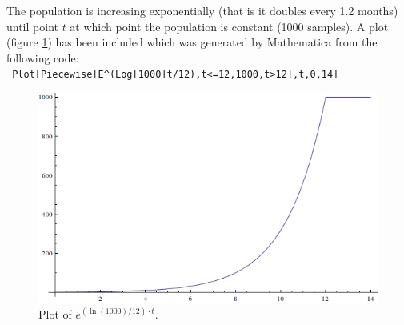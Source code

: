 \begin{enumerate}
  The population is increasing exponentially (that is it doubles every 1.2
  months) until point $t$ at which point the population is constant (1000
  samples). A plot (figure \ref{fig:q5plot}) has been included which was
  generated by Mathematica from the following code:\\
  \texttt{
  Plot[Piecewise[{{E\^{}(Log[1000]t/12),t<=12},{1000,t>12}}],{t,0,14}]
  }
  \begin{figure}[!h]
    \centering
    \includegraphics[width=\linewidth]{solutions/q5/q5plot.png}
  \caption{Plot of $e^{ (\ln(1000)/12)\cdot t}$.}
  \label{fig:q5plot}
  \end{figure}
\end{enumerate}
